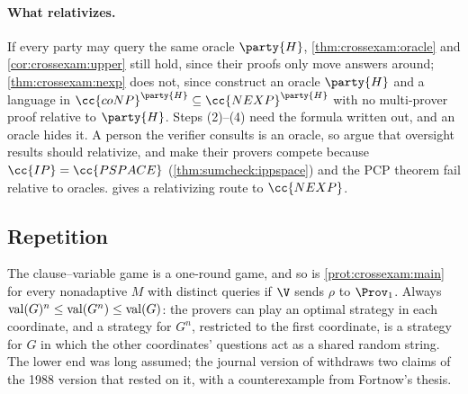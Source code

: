 \begin{refsection}
\paragraph{What relativizes.} If every party may query the same oracle $\party{H}$, \cref{thm:crossexam:oracle} and \cref{cor:crossexam:upper} still hold, since their proofs only move answers around; \cref{thm:crossexam:nexp} does not, since \textcite{FortnowRompelSipser1994} construct an oracle $\party{H}$ and a language in $\cc{coNP}^{\party{H}}\subseteq\cc{NEXP}^{\party{H}}$ with no multi-prover proof relative to $\party{H}$. Steps (2)--(4) need the formula written out, and an oracle hides it. A person the verifier consults is an oracle, so \textcite{IrvingMarshall2025} argue that oversight results should relativize, and \textcite{BrownCohenEtAl2024} make their provers compete because $\cc{IP}=\cc{PSPACE}$ (\cref{thm:sumcheck:ippspace}) and the PCP theorem fail relative to oracles.  gives a relativizing route to $\cc{NEXP}$.

\subsection{Repetition}\label{sec:crossexam:repetition}


The clause--variable game is a one-round game, and so is \cref{prot:crossexam:main} for every nonadaptive $M$ with distinct queries if $\V$ sends $\rho$ to $\Prov_1$. Always $\mathrm{val}(G)^n\le\mathrm{val}(G^n)\le\mathrm{val}(G)$: the provers can play an optimal strategy in each coordinate, and a strategy for $G^n$, restricted to the first coordinate, is a strategy for $G$ in which the other coordinates' questions act as a shared random string. The lower end was long assumed; the journal version of \textcite{FortnowRompelSipser1994} withdraws two claims of the 1988 version that rested on it, with a counterexample from Fortnow's thesis.


\end{refsection}
